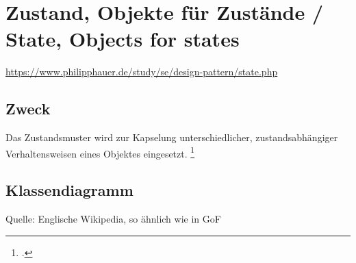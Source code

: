 \documentclass{lehramt-informatik-haupt}
\begin{document}

\chapter{Zustand, Objekte für Zustände / State, Objects for states}

\begin{quellen}
\item \cite{wiki:zustand}
\item \url{https://www.philipphauer.de/study/se/design-pattern/state.php}
\item \cite[PDF Seite 258-265]{gof}
\item \cite[Seite 69-81]{siebler}
\end{quellen}

\section{Zweck}

Das Zustandsmuster wird zur Kapselung unterschiedlicher,
zustandsabhängiger Verhaltensweisen eines Objektes eingesetzt.
\footcite{wiki:zustand}

%

\section{Klassendiagramm}


Quelle: Englische Wikipedia, so ähnlich wie in GoF
\end{document}
